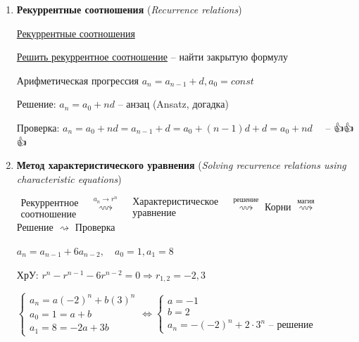 \documentclass[12pt]{article}
\begin{document}
    \begin{enumerate}
        \item \textbf{Рекуррентные соотношения} (\textit{Recurrence relations})
        
        \hyperlink{recurrencerelations}{Рекуррентные соотношения}

        \underline{Решить рекуррентное соотношение} -- найти закрытую формулу

        \Exs Арифметическая прогрессия $a_n = a_{n - 1} + d, a_0 = const$

        Решение: $a_n = a_0 + nd$ -- анзац (Ansatz, догадка)

        Проверка: $a_n = a_0 + nd = a_{n - 1} + d = a_0 + (n - 1)d + d = a_0 + nd \quad$ -- {\Large👍👍👍}

        \item \textbf{Метод характеристического уравнения} (\textit{Solving recurrence relations using characteristic equations})

        $\substack{\text{Рекуррентное} \\ \text{соотношение}}$ \ $\stackrel{a_n \to r^n}{\rightsquigarrow}$ \ $\substack{\text{Характеристическое} \\ \text{уравнение}}$ \ $\stackrel{\text{решение}}{\rightsquigarrow}$ Корни $\stackrel{\text{магия}}{\rightsquigarrow}$ Решение $\rightsquigarrow$ Проверка

        \vspace{3mm}

        \Exs $a_n = a_{n - 1} + 6a_{n - 2}, \quad a_0 = 1, a_1 = 8$

        ХрУ: $r^n - r^{n - 1} - 6r^{n - 2} = 0 \Longrightarrow r_{1,2} = -2, 3$


        \vspace{3mm}

        $
        \begin{cases}a_n = a(-2)^n + b(3)^n \\ a_0 = 1 = a + b \\ a_1 = 8 = -2a + 3b\end{cases} \Longleftrightarrow
        \begin{cases}a = -1 \\ b = 2 \\ a_n = -(-2)^n + 2 \cdot 3^n \text{ -- решение}\end{cases}
        $



\end{enumerate}
\end{document}
